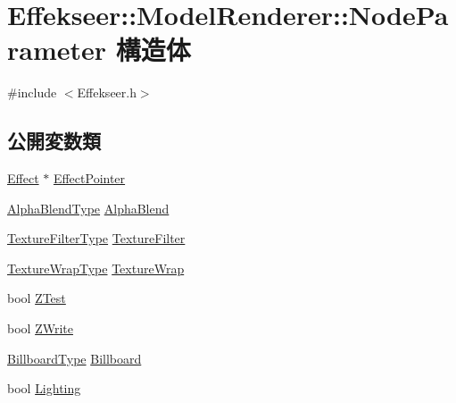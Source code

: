 \hypertarget{struct_effekseer_1_1_model_renderer_1_1_node_parameter}{}\section{Effekseer\+:\+:Model\+Renderer\+:\+:Node\+Parameter 構造体}
\label{struct_effekseer_1_1_model_renderer_1_1_node_parameter}


{\ttfamily \#include $<$Effekseer.\+h$>$}

\subsection*{公開変数類}
\begin{DoxyCompactItemize}
\item 
\mbox{\hyperlink{class_effekseer_1_1_effect}{Effect}} $\ast$ \mbox{\hyperlink{struct_effekseer_1_1_model_renderer_1_1_node_parameter_a593a1a84d97fde65b420b0688182184c}{Effect\+Pointer}}
\item 
\mbox{\hyperlink{namespace_effekseer_a8c32fd5b7ec7feed73314b2ae8086949}{Alpha\+Blend\+Type}} \mbox{\hyperlink{struct_effekseer_1_1_model_renderer_1_1_node_parameter_a412adbcede66578e67fc52338df61843}{Alpha\+Blend}}
\item 
\mbox{\hyperlink{namespace_effekseer_ae3518502cfcb4ec4991f13c0b3e4c6ee}{Texture\+Filter\+Type}} \mbox{\hyperlink{struct_effekseer_1_1_model_renderer_1_1_node_parameter_ab5153c949b1fa4a5a176c3930cf556d0}{Texture\+Filter}}
\item 
\mbox{\hyperlink{namespace_effekseer_a5320c83784602974b6278bf1a77b58a3}{Texture\+Wrap\+Type}} \mbox{\hyperlink{struct_effekseer_1_1_model_renderer_1_1_node_parameter_a1c746c0a2a09cc5e61b5b18faf9e90b4}{Texture\+Wrap}}
\item 
bool \mbox{\hyperlink{struct_effekseer_1_1_model_renderer_1_1_node_parameter_a1618ec9d6054c1ab4e7ae3d6aba0c1ea}{Z\+Test}}
\item 
bool \mbox{\hyperlink{struct_effekseer_1_1_model_renderer_1_1_node_parameter_ad7dee83188011c4dea4313ef0cf21570}{Z\+Write}}
\item 
\mbox{\hyperlink{namespace_effekseer_a1e51959dc188f6f19acc48c85860c6d8}{Billboard\+Type}} \mbox{\hyperlink{struct_effekseer_1_1_model_renderer_1_1_node_parameter_aeee6d5672b552d8cd6a57ba0280ad4c5}{Billboard}}
\item 
bool \mbox{\hyperlink{struct_effekseer_1_1_model_renderer_1_1_node_parameter_ac7b1135e681dd89d17686dbf275ad856}{Lighting}}

\end{DoxyCompactItemize}
